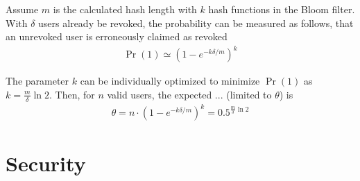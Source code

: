 \documentclass{IEEEconf}
\begin{document}
Assume $m$ is the calculated hash length with $k$ hash functions in the Bloom filter. With $\delta$ users already be revoked, the probability can be measured as follows, that an unrevoked user is erroneously claimed as revoked  
\begin{align} 
    \Pr(1) \simeq (1 - e^{-k\delta/m})^k 
 \end{align}

The parameter $k$ can be individually optimized to minimize $\Pr(1)$ as $ k = \frac{m}{\delta}\ln 2$. Then, for $n$ valid users, the expected ... (limited to $\theta$) is 
\begin{align}
    \theta = n \cdot (1 - e^{-k\delta/m})^{k} = 0.5^{\frac{m}{\delta}\ln 2}
\end{align}

\section{Security }
\end{document}
